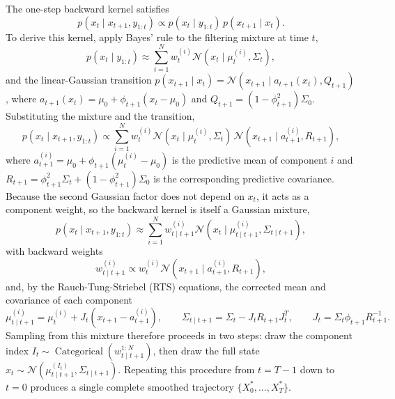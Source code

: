 The one-step backward kernel satisfies
\begin{equation}
p(x_t \mid x_{t+1}, y_{1:t}) \propto p(x_t \mid y_{1:t})\, p(x_{t+1} \mid x_t).
\end{equation}
To derive this kernel, apply Bayes' rule to the filtering mixture at time $t$,
\begin{equation}
p(x_t \mid y_{1:t}) \approx \sum_{i=1}^N w_t^{(i)} \mathcal{N}(x_t \mid \mu_t^{(i)}, \Sigma_t),
\end{equation}
and the linear-Gaussian transition $p(x_{t+1} \mid x_t) = \mathcal{N}(x_{t+1} \mid a_{t+1}(x_t), Q_{t+1})$, where $a_{t+1}(x_t) = \mu_0 + \phi_{t+1}(x_t - \mu_0)$ and $Q_{t+1} = (1 - \phi_{t+1}^2)\Sigma_0$. Substituting the mixture and the transition,
\begin{equation}
p(x_t \mid x_{t+1}, y_{1:t}) \propto \sum_{i=1}^N w_t^{(i)} \mathcal{N}(x_t \mid \mu_t^{(i)}, \Sigma_t)\, \mathcal{N}(x_{t+1} \mid a_{t+1}^{(i)}, R_{t+1}),
\end{equation}
where $a_{t+1}^{(i)} = \mu_0 + \phi_{t+1}(\mu_t^{(i)} - \mu_0)$ is the predictive mean of component $i$ and $R_{t+1} = \phi_{t+1}^2 \Sigma_t + (1 - \phi_{t+1}^2)\Sigma_0$ is the corresponding predictive covariance. Because the second Gaussian factor does not depend on $x_t$, it acts as a component weight, so the backward kernel is itself a Gaussian mixture,
\begin{equation}
p(x_t \mid x_{t+1}, y_{1:t}) \approx \sum_{i=1}^N w_{t \mid t+1}^{(i)} \mathcal{N}(x_t \mid \mu_{t \mid t+1}^{(i)}, \Sigma_{t \mid t+1}),
\end{equation}
with backward weights
\begin{equation}
w_{t \mid t+1}^{(i)} \propto w_t^{(i)} \mathcal{N}(x_{t+1} \mid a_{t+1}^{(i)}, R_{t+1}),
\end{equation}
and, by the Rauch-Tung-Striebel (RTS) equations, the corrected mean and covariance of each component
\begin{equation}
\mu_{t \mid t+1}^{(i)} = \mu_t^{(i)} + J_t \left( x_{t+1} - a_{t+1}^{(i)} \right), \qquad \Sigma_{t \mid t+1} = \Sigma_t - J_t R_{t+1} J_t^T, \qquad J_t = \Sigma_t \phi_{t+1} R_{t+1}^{-1}.
\end{equation}
Sampling from this mixture therefore proceeds in two steps: draw the component index $I_t \sim \operatorname{Categorical}(w_{t \mid t+1}^{1:N})$, then draw the full state $x_t \sim \mathcal{N}(\mu_{t \mid t+1}^{(I_t)}, \Sigma_{t \mid t+1})$. Repeating this procedure from $t = T-1$ down to $t = 0$ produces a single complete smoothed trajectory $\{X_0^*, \dots, X_T^*\}$.

